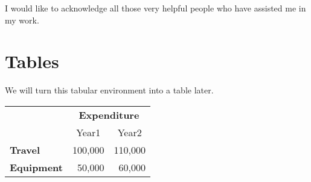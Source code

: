 \documentclass[12pt]{report}
\begin{document}
I would like to acknowledge all those
very helpful people who have assisted
me in my work.

\appendix
\chapter{Tables}

We will turn this tabular environment into a table later.

\begin{tabular}{lrr}
 & \multicolumn{2}{c}{\bfseries Expenditure}\\
 & \multicolumn{1}{c}{Year1} & \multicolumn{1}{c}{Year2}\\
\bfseries Travel & 100,000 & 110,000\\
\bfseries Equipment & 50,000 & 60,000
\end{tabular}
\end{document}
